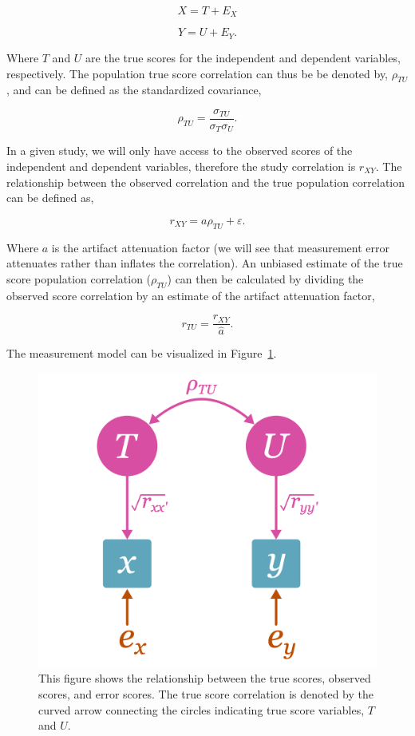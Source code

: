 \documentclass[
  letterpaper,
  DIV=11,
  numbers=noendperiod]{scrreprt}
\begin{document}
\[
X=T+E_X
\]

\[
Y=U+E_Y.
\]

Where \(T\) and \(U\) are the true scores for the independent and
dependent variables, respectively. The population true score correlation
can thus be be denoted by, \(\rho_{TU}\), and can be defined as the
standardized covariance,

\[
\rho_{TU} = \frac{\sigma_{TU}}{\sigma_{T}\sigma_{U}}.
\]

In a given study, we will only have access to the observed scores of the
independent and dependent variables, therefore the study correlation is
\(r_{XY}\). The relationship between the observed correlation and the
true population correlation can be defined as,

\[
r_{XY} = a\rho_{TU} + \varepsilon.
\]

Where \(a\) is the artifact attenuation factor (we will see that
measurement error attenuates rather than inflates the correlation). An
unbiased estimate of the true score population correlation
(\(\rho_{TU}\)) can then be calculated by dividing the observed score
correlation by an estimate of the artifact attenuation factor,

\[
r_{TU} = \frac{r_{XY}}{\hat{a}}.
\]

The measurement model can be visualized in Figure~\ref{fig-corr-model}.

\begin{figure}[H]

{\centering \includegraphics{figure/diagram-estimand-reliability-r.png}

}

\caption{\label{fig-corr-model}This figure shows the relationship
between the true scores, observed scores, and error scores. The true
score correlation is denoted by the curved arrow connecting the circles
indicating true score variables, \(T\) and \(U\).}

\end{figure}
\end{document}
